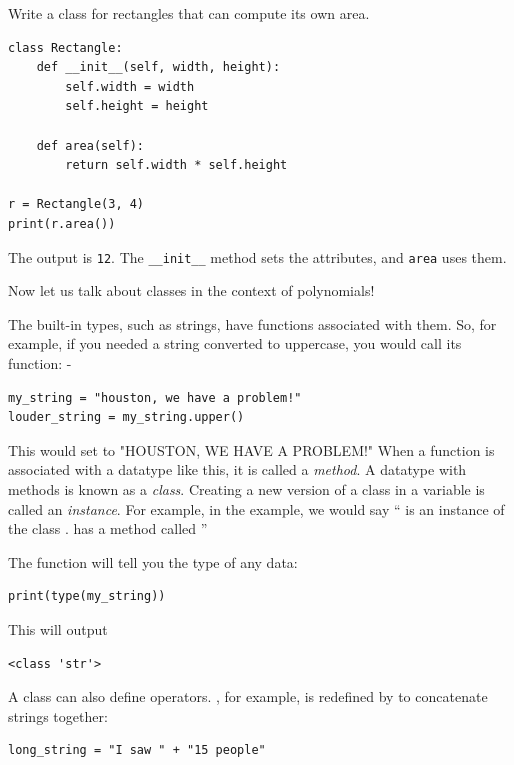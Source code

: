 \begin{Worked}
\begin{Problem}
Write a class for rectangles that can compute its own area.
\end{Problem}
\begin{Solution}
\begin{verbatim}
class Rectangle:
    def __init__(self, width, height):
        self.width = width
        self.height = height

    def area(self):
        return self.width * self.height

r = Rectangle(3, 4)
print(r.area())
\end{verbatim}
The output is \texttt{12}. The \texttt{__init__} method sets the attributes, and \texttt{area} uses them.
\end{Solution}
\end{Worked}

Now let us talk about classes in the context of polynomials!

The built-in types, such as strings, have functions associated with
them. So, for example, if you needed a string converted to uppercase,
you would call its  function:
-
\begin{verbatim}
my_string = "houston, we have a problem!"
louder_string = my_string.upper()
\end{verbatim}
This would set  to "HOUSTON, WE HAVE A PROBLEM!"
When a function is associated with a datatype like this, it is called a
\emph{method}. A datatype with methods is known as a \emph{class}. Creating a new version of a class in a variable is called an \emph{instance}. For
example, in the example, we would say `` is an instance of
the class .  has a method called ''

The function  will tell you the type of any data:
\begin{verbatim}
print(type(my_string))
\end{verbatim}
This will output
\begin{verbatim}
<class 'str'>
\end{verbatim}

A class can also define operators.  \pyfunction{+}, for example, is
redefined by  to concatenate strings together:
\begin{verbatim}
long_string = "I saw " + "15 people"
\end{verbatim}

